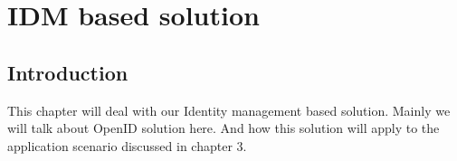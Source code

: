 \chapter{IDM based solution}
\section{Introduction}
This chapter will deal with our Identity management based solution. Mainly we will talk about OpenID solution here. And how this solution will apply to the application scenario discussed in chapter 3.
